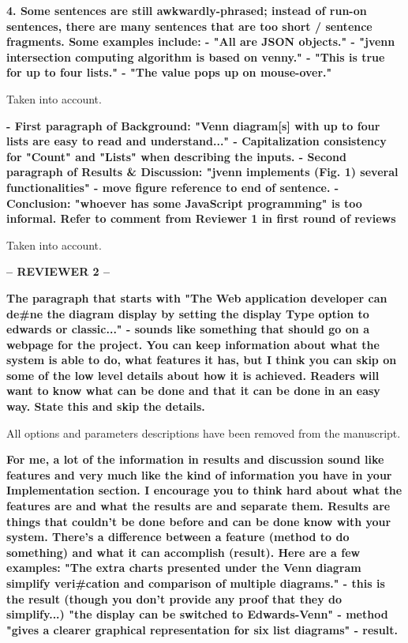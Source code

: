 \documentclass[10pt,stdletter,dateno,sigleft]{newlfm} %
\begin{document}
\begin{newlfm}
\textbf{4. Some sentences are still awkwardly-phrased; instead of run-on
sentences, there are many sentences that are too short / sentence
fragments. Some examples include:\newline
- "All are JSON objects."\newline
- "jvenn intersection computing algorithm is based on venny."\newline
- "This is true for up to four lists."\newline
- "The value pops up on mouse-over."}

Taken into account.


\textbf{- First paragraph of Background: "Venn diagram[s] with up to four lists
are easy to read and understand..."\newline
- Capitalization consistency for "Count" and "Lists" when describing
the inputs.\newline
- Second paragraph of Results & Discussion: "jvenn implements (Fig. 1)
several functionalities" - move figure reference to end of sentence.\newline
- Conclusion: "whoever has some JavaScript programming" is too
informal. Refer to comment from Reviewer 1 in first round of reviews\newline}

Taken into account.


\textbf{-- REVIEWER 2 --}

\textbf{The paragraph that starts with "The Web application developer can de#ne
the diagram display by setting the display Type option to edwards or classic..." -
sounds like something that should go on a webpage for the project. You can
keep information about what the system is able to do, what features it has, but I
think you can skip on some of the low level details about how it is achieved.
Readers will want to know what can be done and that it can be done
in an easy way. State this and skip the details.}

All options and parameters descriptions have been removed from the manuscript.


\textbf{For me, a lot of the information in results and discussion sound like
features and very much like the kind of information you have in your Implementation section. I
encourage you to think hard about what the features are and what the results are
and separate them. Results are things that couldn't be done before and can be
done know with your system. There's a difference between
a feature (method to do something) and what it can accomplish (result). Here are
a few examples:
"The extra charts presented under the Venn diagram simplify veri#cation and
comparison of multiple diagrams." - this is the result (though you don't provide
any proof that they do simplify...)
"the display can be switched to Edwards-Venn" - method
"gives a clearer graphical representation for six list diagrams" - result.}


\end{newlfm}
\end{document}

